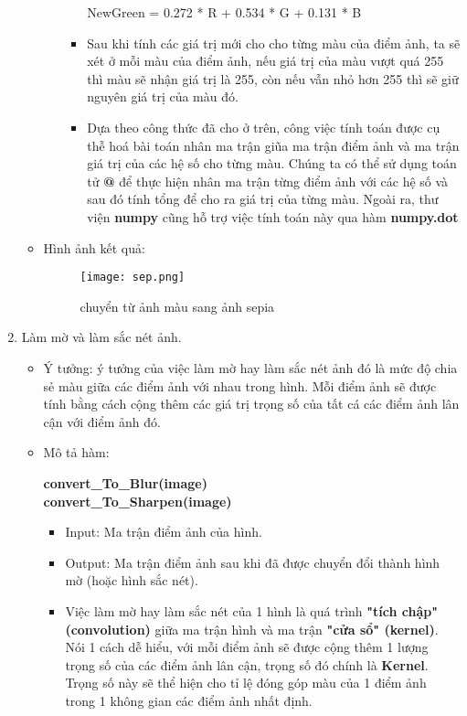 \documentclass{report}
\begin{document}
\begin{enumerate}
\begin{itemize}
\begin{itemize}
\begin{itemize}
\begin{center}
                                NewGreen = 0.272 * R + 0.534 * G + 0.131 * B 
                                \end{center}
                                \item Sau khi tính các giá trị mới cho cho từng màu của điểm ảnh, ta sẽ xét ở mỗi màu của điểm ảnh, nếu giá trị của màu vượt quá 255 thì màu sẽ nhận giá trị là 255, còn nếu vẫn nhỏ hơn 255 thì sẽ giữ nguyên giá trị của màu đó.
                                \item Dựa theo công thức đã cho ở trên, công việc tính toán được cụ thễ hoá bài toán nhân ma trận giũa ma trận điểm ảnh và ma trận giá trị của các hệ số cho từng màu. Chúng ta có thể sử dụng toán tử \textbf{@} để thực hiện nhân ma trận từng điểm ảnh với các hệ số và sau đó tính tổng để cho ra giá trị của từng màu. Ngoài ra, thư viện \textbf{numpy} cũng hỗ trợ việc tính toán này qua hàm \textbf{numpy.dot}
                            \end{itemize}
                    \end{itemize}
                \item Hình ảnh kết quả:
                \begin{figure}[!h]
                    \centering
                    \texttt{[image: sep.png]}
                    \caption{chuyển từ ảnh màu sang ảnh sepia}
                \end{figure}
            \end{itemize}
        \item Làm mờ và làm sắc nét ảnh.
            \begin{itemize}
                \item Ý tưởng: ý tưởng của việc làm mờ hay làm sắc nét ảnh đó là mức độ chia sẻ màu giữa các điểm ảnh với nhau trong hình. Mỗi điểm ảnh sẽ được tính bằng cách cộng thêm các giá trị trọng số của tất cá các điểm ảnh lân cận với điểm ảnh đó.

                \pagebreak
                \item Mô tả hàm:
                \begin{center}
                    \textbf{convert\_To\_Blur(image)\\
                    convert\_To\_Sharpen(image)}
                \end{center}
                \begin{itemize}
                    \item Input: Ma trận điểm ảnh của hình.
                    \item Output: Ma trận điểm ảnh sau khi đã được chuyển đổi thành hình mờ (hoặc hình sắc nét).
                    \item Việc làm mờ hay làm sắc nét của 1 hình là quá trình \textbf{"tích chập" (convolution)} giữa ma trận hình và ma trận \textbf{"cửa sổ" (kernel)}. Nói 1 cách dễ hiểu, với mỗi điểm ảnh sẽ được cộng thêm 1 lượng trọng số của các điểm ảnh lân cận, trọng số đó chính là \textbf{Kernel}. Trọng số này sẽ thể hiện cho tỉ lệ đóng góp màu của 1 điểm ảnh trong 1 không gian các điểm ảnh nhất định.
    

\end{itemize}
\end{itemize}
\end{enumerate}
\end{document}
